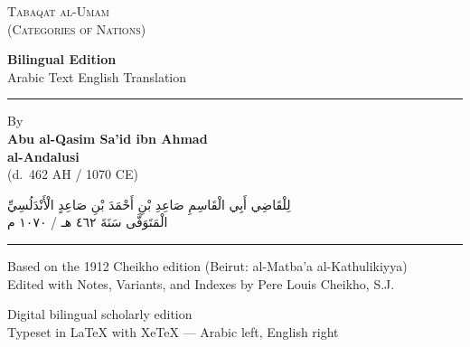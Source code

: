 \documentclass[11pt,a4paper]{article}
\newcommand{\ar}[1]{{\arabicfont\beginR #1\endR}}
\newcommand{\shortline}{\noindent\rule{0.5\textwidth}{0.4pt}\par}
\begin{document}

\thispagestyle{empty}
\begin{center}
\vspace*{1.5cm}

{\Huge\color{titlecolor}\textsc{Tabaqat al-Umam}}\\[0.3cm]
{\Large\color{titlecolor}\textsc{(Categories of Nations)}}

\vspace{1cm}

{\large\color{titlecolor}\ar{كِتَابُ طَبَقَاتِ الْأُمَمِ}}

\vspace{1.5cm}

{\large\textbf{Bilingual Edition}}\\[0.3cm]
{\normalsize Arabic Text \textbullet{} English Translation}

\vspace{1.5cm}

\shortline

\vspace{1cm}

{\large By}\\[0.3cm]
{\LARGE\textbf{Abu al-Qasim Sa'id ibn Ahmad\\al-Andalusi}}\\[0.3cm]
{\normalsize (d.~462 AH / 1070 CE)}

\vspace{1.5cm}

{\large\ar{لِلْقَاضِي أَبِي الْقَاسِمِ صَاعِدِ بْنِ أَحْمَدَ بْنِ صَاعِدٍ الْأَنْدَلُسِيِّ}}\\[0.3cm]
{\normalsize\ar{الْمَتَوَفَّى سَنَةَ ٤٦٢ هـ / ١٠٧٠ م}}

\vspace{1.5cm}

\shortline

\vspace{0.8cm}

{\normalsize Based on the 1912 Cheikho edition (Beirut: al-Matba'a al-Kathulikiyya)}\\[0.2cm]
{\small Edited with Notes, Variants, and Indexes by Pere Louis Cheikho, S.J.}

\vspace{1cm}

{\small Digital bilingual scholarly edition\\
Typeset in LaTeX with XeTeX --- Arabic left, English right}

\vspace*{1.5cm}
\end{center}
\end{document}
